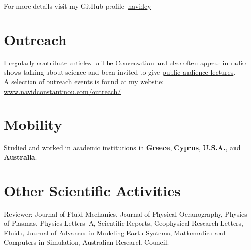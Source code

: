 \documentclass[10pt, letter]{article}
\begin{document}
For more details visit my GitHub profile: \faGithub \hspace{0.2em} \href{https://github.com/navidcy}{navidcy}\\[.2cm]


\vspace{-2em}\section*{\bf Outreach}

I regularly contribute articles to \href{https://theconversation.com/profiles/navid-constantinou-531777}{The Conversation} and also often appear in radio shows talking about science and been invited to give \href{https://atlasoflife.org.au/science-week-2021-presentations/#Navid/}{public audience lectures}. \\[.1cm]

A selection of outreach events is found at my website: \href{https://www.navidconstantinou.com/outreach/}{www.navidconstantinou.com/outreach/} \\[.2cm]


\vspace{-2em}\section*{\bf Mobility}

Studied and worked in academic institutions in \textbf{Greece}, \textbf{Cyprus}, \textbf{U.S.A.}, and \textbf{Australia}.\\[.2cm]


\vspace{-2em}\section*{\bf Other Scientific Activities}

Reviewer: Journal of Fluid Mechanics, Journal of Physical Oceanography, Physics of Plasmas, Physics Letters~A, Scientific Reports, Geophysical Research Letters, Fluids, Journal of Advances in Modeling Earth Systems, Mathematics and Computers in Simulation, Australian Research Council.\\[.2cm]

\end{document}

